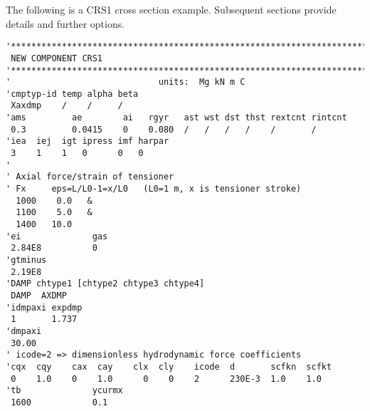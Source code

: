 

The following is a CRS1 cross section example.
Subsequent sections provide details and further options.

\begin{lstlisting}[language=riflex, numbers=none, frame=LTRB,frameround=tttt,framesep=4pt,
                                    xleftmargin=0cm,  xrightmargin=0cm,
                                    caption={CRS1 - Axisymmetric cross section, non-linear axial force and axial damping.}]
'**********************************************************************
 NEW COMPONENT CRS1
'**********************************************************************
'                             units:  Mg kN m C
'cmptyp-id temp alpha beta
 Xaxdmp    /    /     /
'ams         ae        ai   rgyr   ast wst dst thst rextcnt rintcnt
 0.3         0.0415    0    0.080  /   /   /   /    /       /
'iea  iej  igt ipress imf harpar
 3    1    1   0      0   0
'
' Axial force/strain of tensioner
' Fx     eps=L/L0-1=x/L0   (L0=1 m, x is tensioner stroke)
  1000    0.0   &
  1100    5.0   &
  1400   10.0
'ei              gas
 2.84E8          0
'gtminus
 2.19E8
'DAMP chtype1 [chtype2 chtype3 chtype4]
 DAMP  AXDMP
'idmpaxi expdmp
 1       1.737
'dmpaxi
 30.00
' icode=2 => dimensionless hydrodynamic force coefficients
'cqx  cqy    cax  cay    clx  cly    icode  d       scfkn  scfkt
 0    1.0    0    1.0      0    0    2      230E-3  1.0    1.0
'tb              ycurmx
 1600            0.1
\end{lstlisting}
